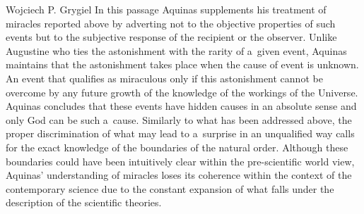 \begin{artengenv}{Wojciech P. Grygiel}
In this passage Aquinas supplements his treatment of miracles reported above by adverting not to the objective properties of such events but to the subjective response of the recipient or the observer. Unlike Augustine who ties the astonishment with the rarity of a~given event, Aquinas maintains that the astonishment takes place when the cause of event is unknown. An event that qualifies as miraculous only if this astonishment cannot be overcome by any future growth of the knowledge of the workings of the Universe. Aquinas concludes that these events have hidden causes in an absolute sense and only God can be such a~cause. Similarly to what has been addressed above, the proper discrimination of what may lead to a~surprise in an unqualified way calls for the exact knowledge of the boundaries of the natural order. Although these boundaries could have been intuitively clear within the pre-scientific world view, Aquinas’ understanding of miracles loses its coherence within the context of the contemporary science due to the constant expansion of what falls under the description of the scientific theories.


\end{artengenv}
